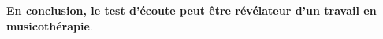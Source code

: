                 \textbf{ En conclusion, le test
                d'écoute peut être \textbf{révélateur d'un
                travail en musicothérapie}}.


























































































